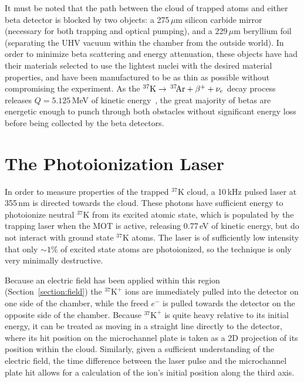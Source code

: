 It must be noted that the path between the cloud of trapped atoms and either beta detector is blocked by two objects:  a 275$\,\mu$m silicon carbide mirror (necessary for both trapping and optical pumping), and a 229$\,\mu$m beryllium foil (separating the UHV vacuum within the chamber from the outside world).  In order to minimize beta scattering and energy attenuation, these objects have had their materials selected to use the lightest nuclei with the desired material properties, and have been manufactured to be as thin as possible without compromising the experiment.  As the $^{37}\textrm{K} \rightarrow \,^{37}\textrm{\!Ar} + \beta^{+} + \nu_e$ decay process releases $Q=5.125$\,MeV of kinetic energy~\cite{Q_value}, the great majority of betas are energetic enough to punch through both obstacles without significant energy loss before being collected by the beta detectors.  




\section{The Photoionization Laser}
\label{cloud}
\label{photoions}
In order to measure properties of the trapped $^{37}\textrm{K}$ cloud, a 10\,kHz pulsed laser at 355\,nm is directed towards the cloud.  These photons have sufficient energy to photoionize neutral $^{37}\textrm{K}$ from its excited atomic state, which is populated by the trapping laser when the MOT is active, releasing 0.77\,eV of kinetic energy, but do not interact with ground state $^{37}\textrm{K}$ atoms.  The laser is of sufficiently low intensity that only $\sim 1\%$ of excited state atoms are photoionized, so the technique is only very minimally destructive.

Because an electric field has been applied within this region (Section~\ref{section:field})
the $^{37}\textrm{K}^+$ ions are immediately pulled into the detector on one side of the chamber, while the freed $e^-$ is pulled towards the detector on the opposite side of the chamber.  Because  $^{37}\textrm{K}^+$ is quite heavy relative to its initial energy, it can be treated as moving in a straight line directly to the detector, where its hit position on the microchannel plate is taken as a 2D projection of its position within the cloud.  Similarly, given a sufficient understanding of the electric field, the time difference between the laser pulse and the microchannel plate hit allows for a calculation of the ion's initial position along the third axis.  

